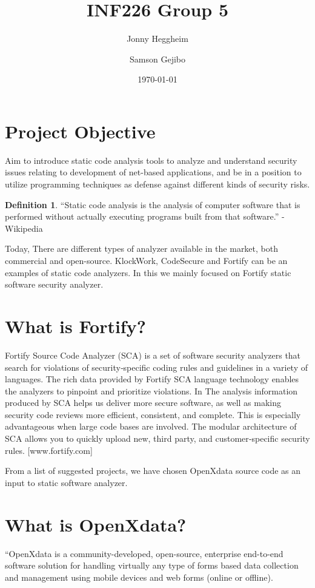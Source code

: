 \documentclass[11pt,a4paper]{article}
\title{INF226 Group 5}
\author{Jonny Heggheim \and Samson Gejibo}
\date{\today}
\theoremstyle{definition}
\newtheorem*{defn}{Definition}
\begin{document}
\maketitle
\tableofcontents
\newpage

\lstset{
  language=Java,
  frame=single
}

\section{Project Objective}
Aim to introduce static code analysis tools to analyze and understand security
issues relating to development of net-based applications, and be in a position
to utilize programming techniques as defense against different kinds of
security risks.

\begin{defn}
``Static code analysis is the analysis of computer software that is performed
without actually executing programs built from that software.''  - Wikipedia
\end{defn}
Today, There are different types of analyzer available in the market,
both commercial and open-source. KlockWork, CodeSecure and Fortify can be an
examples of static code analyzers.
In this we mainly focused on Fortify static software security analyzer.


\section{What is Fortify?}
Fortify Source Code Analyzer (SCA) is a set of software security analyzers
that search for violations of security‐specific coding rules and guidelines in
a variety of languages. The rich data provided by Fortify SCA language
technology enables the analyzers to pinpoint and prioritize violations.
In The analysis information produced by SCA helps us deliver more secure
software, as well as making security code reviews more efficient, consistent,
and complete. This is especially advantageous when large code bases are
involved. The modular architecture of SCA allows you to quickly upload new,
third party, and customer‐specific security rules. [www.fortify.com]

From a list of suggested projects, we have chosen OpenXdata source code as an
input to static software analyzer.


\section{What is OpenXdata?}
“OpenXdata is a community-developed, open-source, enterprise end-to-end
software solution for handling virtually any type of forms based data
collection and management using mobile devices and web forms
(online or offline).
\end{document}
